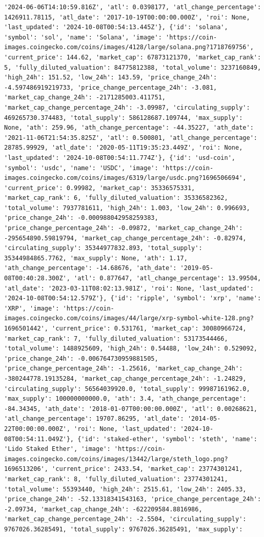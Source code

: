 \documentclass[
  letterpaper,
  DIV=11,
  numbers=noendperiod]{scrreprt}
\begin{document}
\begin{verbatim}
'2024-06-06T14:10:59.816Z', 'atl': 0.0398177, 'atl_change_percentage': 1426911.78115, 'atl_date': '2017-10-19T00:00:00.000Z', 'roi': None, 'last_updated': '2024-10-08T00:54:13.445Z'}, {'id': 'solana', 'symbol': 'sol', 'name': 'Solana', 'image': 'https://coin-images.coingecko.com/coins/images/4128/large/solana.png?1718769756', 'current_price': 144.62, 'market_cap': 67873121370, 'market_cap_rank': 5, 'fully_diluted_valuation': 84775812388, 'total_volume': 3237160849, 'high_24h': 151.52, 'low_24h': 143.59, 'price_change_24h': -4.597486919219733, 'price_change_percentage_24h': -3.081, 'market_cap_change_24h': -2171285003.411751, 'market_cap_change_percentage_24h': -3.09987, 'circulating_supply': 469265730.374483, 'total_supply': 586128687.109744, 'max_supply': None, 'ath': 259.96, 'ath_change_percentage': -44.35227, 'ath_date': '2021-11-06T21:54:35.825Z', 'atl': 0.500801, 'atl_change_percentage': 28785.99929, 'atl_date': '2020-05-11T19:35:23.449Z', 'roi': None, 'last_updated': '2024-10-08T00:54:11.774Z'}, {'id': 'usd-coin', 'symbol': 'usdc', 'name': 'USDC', 'image': 'https://coin-images.coingecko.com/coins/images/6319/large/usdc.png?1696506694', 'current_price': 0.99982, 'market_cap': 35336575331, 'market_cap_rank': 6, 'fully_diluted_valuation': 35336582362, 'total_volume': 7937781611, 'high_24h': 1.003, 'low_24h': 0.996693, 'price_change_24h': -0.000988042958259383, 'price_change_percentage_24h': -0.09872, 'market_cap_change_24h': -295654890.59819794, 'market_cap_change_percentage_24h': -0.82974, 'circulating_supply': 35344977832.893, 'total_supply': 35344984865.7762, 'max_supply': None, 'ath': 1.17, 'ath_change_percentage': -14.68676, 'ath_date': '2019-05-08T00:40:28.300Z', 'atl': 0.877647, 'atl_change_percentage': 13.99504, 'atl_date': '2023-03-11T08:02:13.981Z', 'roi': None, 'last_updated': '2024-10-08T00:54:12.579Z'}, {'id': 'ripple', 'symbol': 'xrp', 'name': 'XRP', 'image': 'https://coin-images.coingecko.com/coins/images/44/large/xrp-symbol-white-128.png?1696501442', 'current_price': 0.531761, 'market_cap': 30080966724, 'market_cap_rank': 7, 'fully_diluted_valuation': 53173544466, 'total_volume': 1488925609, 'high_24h': 0.54488, 'low_24h': 0.529092, 'price_change_24h': -0.006764730959881505, 'price_change_percentage_24h': -1.25616, 'market_cap_change_24h': -380244778.19135284, 'market_cap_change_percentage_24h': -1.24829, 'circulating_supply': 56564039920.0, 'total_supply': 99987161962.0, 'max_supply': 100000000000.0, 'ath': 3.4, 'ath_change_percentage': -84.34345, 'ath_date': '2018-01-07T00:00:00.000Z', 'atl': 0.00268621, 'atl_change_percentage': 19707.86295, 'atl_date': '2014-05-22T00:00:00.000Z', 'roi': None, 'last_updated': '2024-10-08T00:54:11.049Z'}, {'id': 'staked-ether', 'symbol': 'steth', 'name': 'Lido Staked Ether', 'image': 'https://coin-images.coingecko.com/coins/images/13442/large/steth_logo.png?1696513206', 'current_price': 2433.54, 'market_cap': 23774301241, 'market_cap_rank': 8, 'fully_diluted_valuation': 23774301241, 'total_volume': 55393440, 'high_24h': 2515.61, 'low_24h': 2405.33, 'price_change_24h': -52.13318341543163, 'price_change_percentage_24h': -2.09734, 'market_cap_change_24h': -622209584.8816986, 'market_cap_change_percentage_24h': -2.5504, 'circulating_supply': 9767026.36285491, 'total_supply': 9767026.36285491, 'max_supply': 
\end{verbatim}
\end{document}
